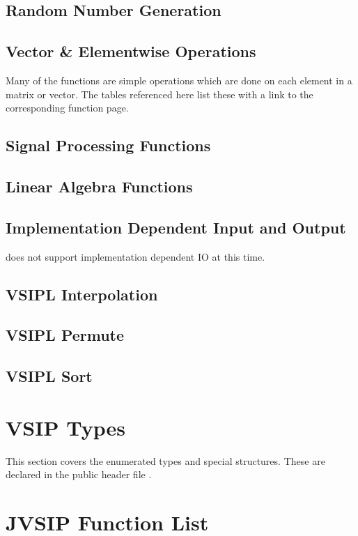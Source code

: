 \subsection*{Random Number Generation}
\subsection*{Vector \& Elementwise Operations}
Many of the functions are simple operations which are done on each element in a matrix or vector. The tables referenced here list these with a link to the corresponding function page.
    
    
\subsection*{Signal Processing Functions}
\subsection*{Linear Algebra Functions}
\subsection*{Implementation Dependent Input and Output}
    does not support implementation dependent IO at this time.
\subsection*{VSIPL Interpolation}

\subsection*{VSIPL Permute}
\subsection*{VSIPL Sort}


\section*{VSIP Types}
This section covers the enumerated types and special structures. These are declared in the public header file . 
\section*{JVSIP Function List} 













